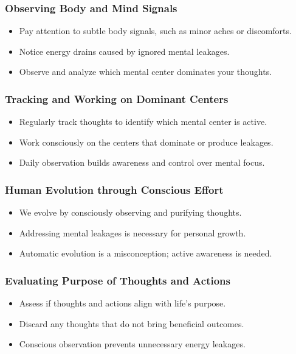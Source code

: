 \begin{frame}[fragile]\frametitle{Observing Body and Mind Signals}
    \begin{itemize}
        \item Pay attention to subtle body signals, such as minor aches or discomforts.
        \item Notice energy drains caused by ignored mental leakages.
        \item Observe and analyze which mental center dominates your thoughts.
    \end{itemize}
\end{frame}

\begin{frame}[fragile]\frametitle{Tracking and Working on Dominant Centers}
    \begin{itemize}
        \item Regularly track thoughts to identify which mental center is active.
        \item Work consciously on the centers that dominate or produce leakages.
        \item Daily observation builds awareness and control over mental focus.
    \end{itemize}
\end{frame}

\begin{frame}[fragile]\frametitle{Human Evolution through Conscious Effort}
    \begin{itemize}
        \item We evolve by consciously observing and purifying thoughts.
        \item Addressing mental leakages is necessary for personal growth.
        \item Automatic evolution is a misconception; active awareness is needed.
    \end{itemize}
\end{frame}

\begin{frame}[fragile]\frametitle{Evaluating Purpose of Thoughts and Actions}
    \begin{itemize}
        \item Assess if thoughts and actions align with life’s purpose.
        \item Discard any thoughts that do not bring beneficial outcomes.
        \item Conscious observation prevents unnecessary energy leakages.
    \end{itemize}
\end{frame}

